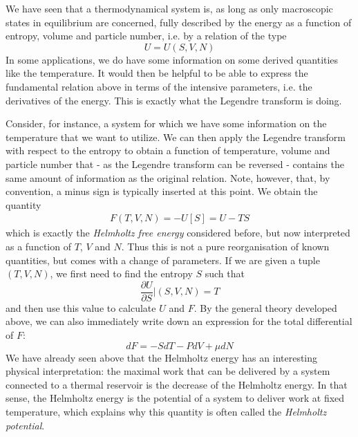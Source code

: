 \documentclass[a4paper, draft]{report}
\numberwithin{section}{chapter}
\numberwithin{equation}{chapter}
\theoremstyle{own}
\theoremstyle{remark}
\begin{document}
We have seen that a thermodynamical system is, as long as only macroscopic states in equilibrium are concerned, fully described by the energy as a function of entropy, volume and particle number, i.e. by a relation of the type
$$
U = U(S,V,N)
$$
In some applications, we do have some information on some derived quantities like the temperature. It would then be helpful to be able to express the fundamental relation above in terms of the intensive parameters, i.e. the derivatives of the energy. This is exactly what the Legendre transform is doing.

Consider, for instance, a system for which we have some information on the temperature that we want to utilize. We can then apply the Legendre transform with respect to the entropy to obtain a function of temperature, volume and particle number that - as the Legendre transform can be reversed - contains the same amount of information as the original relation. Note, however, that, by convention, a minus sign is typically inserted at this point. We obtain the quantity
\begin{align}\label{eq:helmholtzenergy}
F(T,V,N) = -U[S] = U - TS
\end{align}
which is exactly the {\em Helmholtz free energy} considered before, but now interpreted as a function of $T$, $V$ and $N$. Thus this is not a pure reorganisation of known quantities, but comes with a change of parameters. If we are given a tuple $(T,V,N)$, we first need to find the entropy $S$ such that 
$$
\frac{\partial U}{\partial S} | (S,V,N) = T
$$
and then use this value to calculate $U$ and $F$. By the general theory developed above, we can also immediately write down an expression for the total 
differential of $F$:
$$
dF = - S dT - PdV + \mu dN
$$
We have already seen above that the Helmholtz energy has an interesting physical interpretation: the maximal work that can be delivered by a system connected to a thermal reservoir is the decrease of the Helmholtz energy. In that sense, the Helmholtz energy is the potential of a system to deliver work at fixed temperature, which explains why this quantity is often called the {\em Helmholtz potential}.
\end{document}
